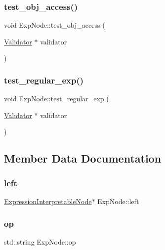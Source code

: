 \subsubsection{\texorpdfstring{test\+\_\+obj\+\_\+access()}{test\_obj\_access()}}
{\footnotesize\ttfamily void Exp\+Node\+::test\+\_\+obj\+\_\+access (\begin{DoxyParamCaption}\item[{\hyperlink{classValidator}{Validator} $\ast$}]{validator }\end{DoxyParamCaption})}

\mbox{\label{classExpNode_ab5fbb36f2d6beebe5cd5c9a651debc57}} 
\subsubsection{\texorpdfstring{test\+\_\+regular\+\_\+exp()}{test\_regular\_exp()}}
{\footnotesize\ttfamily void Exp\+Node\+::test\+\_\+regular\+\_\+exp (\begin{DoxyParamCaption}\item[{\hyperlink{classValidator}{Validator} $\ast$}]{validator }\end{DoxyParamCaption})}



\subsection{Member Data Documentation}
\mbox{\label{classExpNode_abd5f79666f0b8f05e7a3fca1bfc12ebe}} 
\subsubsection{\texorpdfstring{left}{left}}
{\footnotesize\ttfamily \hyperlink{classExpressionInterpretableNode}{Expression\+Interpretable\+Node}$\ast$ Exp\+Node\+::left}

\mbox{\label{classExpNode_a7ad8830c081f08f598e4697539b22c28}} 
\subsubsection{\texorpdfstring{op}{op}}
{\footnotesize\ttfamily std\+::string Exp\+Node\+::op}

